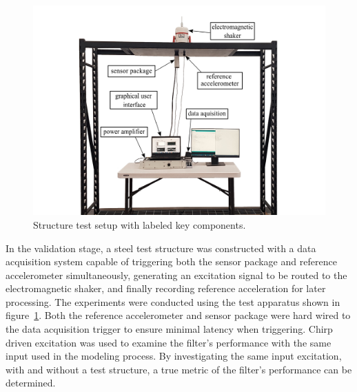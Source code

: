 \documentclass[]{spie}  %
\begin{document}
	\begin{figure} [H]
		\centering
		\includegraphics[width=6 in]{figures/structure experimental setup.png}
		\caption{Structure test setup with labeled key components.}
		\label{fig:structure experimental setup} 
	\end{figure}


	
	In the validation stage, a steel test structure was constructed with a data acquisition system capable of triggering both the sensor package and reference accelerometer simultaneously, generating an excitation signal to be routed to the electromagnetic shaker, and finally recording reference acceleration for later processing. The experiments were conducted using the test apparatus shown in figure~\ref{fig:structure experimental setup}. Both the reference accelerometer and sensor package were hard wired to the data acquisition trigger to ensure minimal latency when triggering. Chirp driven excitation was used to examine the filter’s performance with the same input used in the modeling process. By investigating the same input excitation, with and without a test structure, a true metric of the filter’s performance can be determined.  
		
\end{document}

